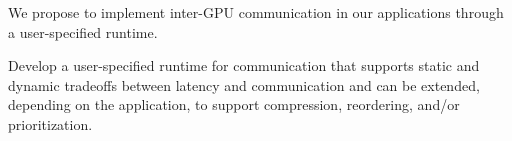 We propose to implement inter-GPU communication in our applications through a user-specified runtime.

\begin{rproblem}
Develop a user-specified runtime for communication that supports static and dynamic tradeoffs between latency and communication and can be extended, depending on the application, to support compression, reordering, and/or prioritization.
\end{rproblem}


